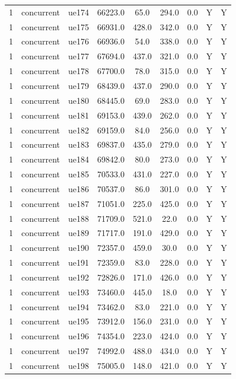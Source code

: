 \begin{table}[ht]
\begin{tabular}{|c|c|c|c|c|c|c|c|c|}
1 & concurrent & ue174 & 66223.0 & 65.0 & 294.0 & 0.0 & Y & Y \\
1 & concurrent & ue175 & 66931.0 & 428.0 & 342.0 & 0.0 & Y & Y \\
1 & concurrent & ue176 & 66936.0 & 54.0 & 338.0 & 0.0 & Y & Y \\
1 & concurrent & ue177 & 67694.0 & 437.0 & 321.0 & 0.0 & Y & Y \\
1 & concurrent & ue178 & 67700.0 & 78.0 & 315.0 & 0.0 & Y & Y \\
1 & concurrent & ue179 & 68439.0 & 437.0 & 290.0 & 0.0 & Y & Y \\
1 & concurrent & ue180 & 68445.0 & 69.0 & 283.0 & 0.0 & Y & Y \\
1 & concurrent & ue181 & 69153.0 & 439.0 & 262.0 & 0.0 & Y & Y \\
1 & concurrent & ue182 & 69159.0 & 84.0 & 256.0 & 0.0 & Y & Y \\
1 & concurrent & ue183 & 69837.0 & 435.0 & 279.0 & 0.0 & Y & Y \\
1 & concurrent & ue184 & 69842.0 & 80.0 & 273.0 & 0.0 & Y & Y \\
1 & concurrent & ue185 & 70533.0 & 431.0 & 227.0 & 0.0 & Y & Y \\
1 & concurrent & ue186 & 70537.0 & 86.0 & 301.0 & 0.0 & Y & Y \\
1 & concurrent & ue187 & 71051.0 & 225.0 & 425.0 & 0.0 & Y & Y \\
1 & concurrent & ue188 & 71709.0 & 521.0 & 22.0 & 0.0 & Y & Y \\
1 & concurrent & ue189 & 71717.0 & 191.0 & 429.0 & 0.0 & Y & Y \\
1 & concurrent & ue190 & 72357.0 & 459.0 & 30.0 & 0.0 & Y & Y \\
1 & concurrent & ue191 & 72359.0 & 83.0 & 228.0 & 0.0 & Y & Y \\
1 & concurrent & ue192 & 72826.0 & 171.0 & 426.0 & 0.0 & Y & Y \\
1 & concurrent & ue193 & 73460.0 & 445.0 & 18.0 & 0.0 & Y & Y \\
1 & concurrent & ue194 & 73462.0 & 83.0 & 221.0 & 0.0 & Y & Y \\
1 & concurrent & ue195 & 73912.0 & 156.0 & 231.0 & 0.0 & Y & Y \\
1 & concurrent & ue196 & 74354.0 & 223.0 & 424.0 & 0.0 & Y & Y \\
1 & concurrent & ue197 & 74992.0 & 488.0 & 434.0 & 0.0 & Y & Y \\
1 & concurrent & ue198 & 75005.0 & 148.0 & 421.0 & 0.0 & Y & Y \\

\end{tabular}
\end{table}
